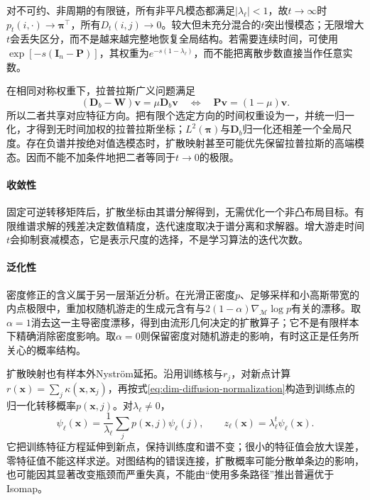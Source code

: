 对不可约、非周期的有限链，所有非平凡模态都满足$|\lambda_\ell|<1$，故$t\to\infty$时$p_t(i,\cdot)\to\bm{\pi}^{\top}$，所有$D_t(i,j)\to0$。较大但未充分混合的$t$突出慢模态；无限增大$t$会丢失区分，而不是越来越完整地恢复全局结构。若需要连续时间，可使用$\exp[-s(\bm{I}_n-\bm{P})]$，其权重为$e^{-s(1-\lambda_\ell)}$，而不能把离散步数直接当作任意实数。

在相同对称权重下，拉普拉斯广义问题满足
\[
  (\bm{D}_b-\bm{W})\bm{v}=\mu\bm{D}_b\bm{v}
  \quad\Longleftrightarrow\quad
  \bm{P}\bm{v}=(1-\mu)\bm{v}.
\]
所以二者共享对应特征方向。把有限个选定方向的时间权重设为一，并统一归一化，才得到无时间加权的拉普拉斯坐标；$L^2(\bm{\pi})$与$\bm{D}_b$归一化还相差一个全局尺度。存在负谱并按绝对值选模态时，扩散映射甚至可能优先保留拉普拉斯的高端模态。因而不能不加条件地把二者等同于$t\to0$的极限。

\paragraph{收敛性}
固定可逆转移矩阵后，扩散坐标由其谱分解得到，无需优化一个非凸布局目标。有限维谱求解的残差决定数值精度，迭代速度取决于谱分离和求解器。增大游走时间$t$会抑制衰减模态，它是表示尺度的选择，不是学习算法的迭代次数。

\paragraph{泛化性}

密度修正的含义属于另一层渐近分析。在光滑正密度$p$、足够采样和小高斯带宽的内点极限中，重加权随机游走的生成元含有与$2(1-\alpha)\nabla_{\mathcal{M}}\log p$有关的漂移。取$\alpha=1$消去这一主导密度漂移，得到由流形几何决定的扩散算子；它不是有限样本下精确消除密度影响。取$\alpha=0$则保留密度对随机游走的影响，有时这正是任务所关心的概率结构。

扩散映射也有样本外Nystr\"om延拓。沿用训练核与$r_j$，对新点计算$r(\bm{x})=\sum_j\kappa(\bm{x},\bm{x}_j)$，再按式\eqref{eq:dim-diffusion-normalization}构造到训练点的归一化转移概率$p(\bm{x},j)$。对$\lambda_\ell\ne0$，
\begin{equation}
  \label{eq:dim-diffusion-extension}
  \psi_\ell(\bm{x})
  =\frac1{\lambda_\ell}\sum_jp(\bm{x},j)\psi_\ell(j),
  \qquad
  z_\ell(\bm{x})=\lambda_\ell^t\psi_\ell(\bm{x}).
\end{equation}
它把训练特征方程延伸到新点，保持训练度和谱不变；很小的特征值会放大误差，零特征值不能这样求逆。对图结构的错误连接，扩散概率可能分散单条边的影响，也可能因其显著改变瓶颈而严重失真，不能由“使用多条路径”推出普遍优于Isomap。

